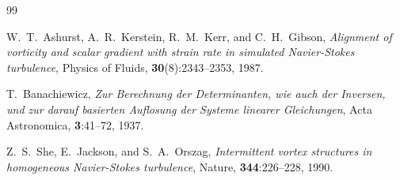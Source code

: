 \documentclass[11pt,a4paper]{article}
\theoremstyle{definition}
\begin{document}
\begin{thebibliography}{99}

W.~T.~Ashurst, A.~R.~Kerstein, R.~M.~Kerr, and C.~H.~Gibson,
\textit{Alignment of vorticity and scalar gradient with strain rate in simulated Navier-Stokes turbulence},
Physics of Fluids, \textbf{30}(8):2343--2353, 1987.

T.~Banachiewicz,
\textit{Zur Berechnung der Determinanten, wie auch der Inversen, und zur darauf basierten Auflosung der Systeme linearer Gleichungen},
Acta Astronomica, \textbf{3}:41--72, 1937.

Z.~S.~She, E.~Jackson, and S.~A.~Orszag,
\textit{Intermittent vortex structures in homogeneous Navier-Stokes turbulence},
Nature, \textbf{344}:226--228, 1990.

\end{thebibliography}
\end{document}
